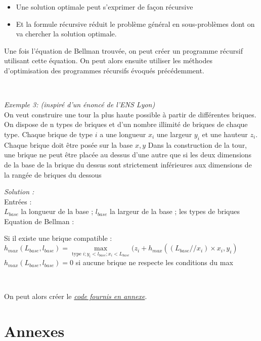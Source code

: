 \documentclass[
  paper=a4,
  ,captions=tableheading
]{scrartcl}
\providecommand{\tightlist}{%
  \setlength{\itemsep}{0pt}\setlength{\parskip}{0pt}}
\begin{document}
\begin{itemize}
\tightlist
\item
  Une solution optimale peut s'exprimer de façon récursive\\
\item
  Et la formule récursive réduit le problème général en sous-problèmes
  dont on va chercher la solution optimale.
\end{itemize}

Une fois l'équation de Bellman trouvée, on peut créer un programme
récursif utilisant cette équation. On peut alors ensuite utiliser les
méthodes d'optimisation des programmes récursifs évoqués précédemment.

~\\
\hspace*{0.333em}

\emph{Exemple 3: (inspiré d'un énoncé de l'ENS Lyon)}\\
On veut construire une tour la plus haute possible à partir de
différentes briques. On dispose de n types de briques et d'un nombre
illimité de briques de chaque type. Chaque brique de type \(i\) a une
longueur \(x_i\) une largeur \(y_i\) et une hauteur \(z_i\). Chaque
brique doit être posée sur la base \(x,y\) Dans la construction de la
tour, une brique ne peut être placée au dessus d'une autre que si les
deux dimensions de la base de la brique du dessus sont strictement
inférieures aux dimensions de la rangée de briques du dessous

\emph{Solution :}\\
Entrées :\\
\(L_{base}\) la longueur de la base ; \(l_{base}\) la largeur de la base
; les types de briques\\
Equation de Bellman :

Si il existe une brique compatible :\\
\(h_{max}(L_{base}, l_{base}) = \underset{\textrm{type } i ; y_i < l_{base} ; x_i < L_{base}} {\max}( z_i + h_{max}( (L_{base}//x_i ) \times x_i, y_i)\)\\
\(h_{max}(L_{base}, l_{base}) = 0\) si aucune brique ne respecte les
conditions du max

~

On peut alors créer le \protect\hyperlink{exemple3}{\emph{code fournis
en annexe}}.

\hypertarget{annexes}{%
\section{Annexes}\label{annexes}}
\end{document}
